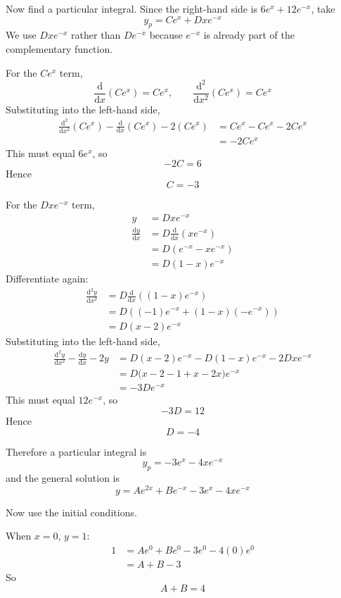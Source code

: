 \documentclass[leqno]{article}
\begin{document}
\begin{enumerate}[
  label=\textbf{\arabic*.},
  leftmargin=*,
  topsep=0pt,
  partopsep=0pt,
  parsep=0pt
]
\begin{tcolorbox}[colback=white, colframe=scarlet, title={\textbf{Solution}}, breakable, grow to left by=6mm, grow to right by=10mm]
\begin{enumerate}[label=\textbf{(\alph*)}]
Now find a particular integral. Since the right-hand side is $6e^x+12e^{-x}$, take
\[
y_p=Ce^x+Dxe^{-x}
\]
We use $Dxe^{-x}$ rather than $De^{-x}$ because $e^{-x}$ is already part of the complementary function.

For the $Ce^x$ term,
\[
\frac{\mathrm{d}}{\mathrm{d}x}(Ce^x)=Ce^x,
\qquad
\frac{\mathrm{d}^2}{\mathrm{d}x^2}(Ce^x)=Ce^x
\]
Substituting into the left-hand side,
\begin{align*}
\frac{\mathrm{d}^2}{\mathrm{d}x^2}(Ce^x)-\frac{\mathrm{d}}{\mathrm{d}x}(Ce^x)-2(Ce^x)
&=Ce^x-Ce^x-2Ce^x\\
&=-2Ce^x
\end{align*}
This must equal $6e^x$, so
\[
-2C=6
\]
Hence
\[
C=-3
\]

For the $Dxe^{-x}$ term,
\begin{align*}
y&=Dxe^{-x}\\
\frac{\mathrm{d}y}{\mathrm{d}x}
&=D\frac{\mathrm{d}}{\mathrm{d}x}(xe^{-x})\\
&=D\left(e^{-x}-xe^{-x}\right)\\
&=D(1-x)e^{-x}
\end{align*}
Differentiate again:
\begin{align*}
\frac{\mathrm{d}^2 y}{\mathrm{d}x^2}
&=D\frac{\mathrm{d}}{\mathrm{d}x}\left((1-x)e^{-x}\right)\\
&=D\left((-1)e^{-x}+(1-x)(-e^{-x})\right)\\
&=D(x-2)e^{-x}
\end{align*}
Substituting into the left-hand side,
\begin{align*}
\frac{\mathrm{d}^2 y}{\mathrm{d}x^2}-\frac{\mathrm{d}y}{\mathrm{d}x}-2y
&=D(x-2)e^{-x}-D(1-x)e^{-x}-2Dxe^{-x}\\
&=D\bigl(x-2-1+x-2x\bigr)e^{-x}\\
&=-3De^{-x}
\end{align*}
This must equal $12e^{-x}$, so
\[
-3D=12
\]
Hence
\[
D=-4
\]

Therefore a particular integral is
\[
y_p=-3e^x-4xe^{-x}
\]
and the general solution is
\[
y=Ae^{2x}+Be^{-x}-3e^x-4xe^{-x}
\]

Now use the initial conditions.

When $x=0$, $y=1$:
\begin{align*}
1
&=Ae^0+Be^0-3e^0-4(0)e^0\\
&=A+B-3
\end{align*}
So
\[
A+B=4
\]


\end{enumerate}
\end{tcolorbox}
\end{enumerate}
\end{document}

